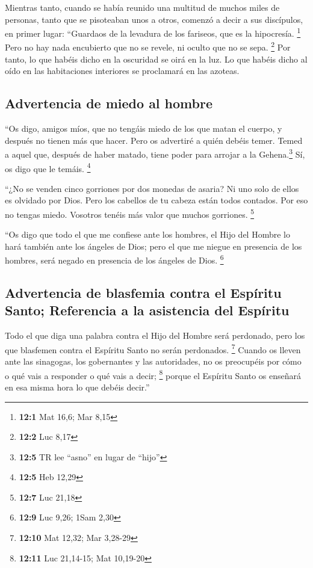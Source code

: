 \begin{paracol}{2}
 Mientras tanto, cuando se había reunido una multitud de
muchos miles de personas, tanto que se pisoteaban unos a otros, comenzó
a decir a sus discípulos, en primer lugar: ``Guardaos de la levadura de
los fariseos, que es la hipocresía. \footnote{\textbf{12:1} Mat 16,6;
  Mar 8,15}  Pero no hay nada encubierto que no se revele,
ni oculto que no se sepa. \footnote{\textbf{12:2} Luc 8,17}
 Por tanto, lo que habéis dicho en la oscuridad se oirá en
la luz. Lo que habéis dicho al oído en las habitaciones interiores se
proclamará en las azoteas.

\hypertarget{advertencia-de-miedo-al-hombre}{%
\subsection{Advertencia de miedo al
hombre}\label{advertencia-de-miedo-al-hombre}}

 ``Os digo, amigos míos, que no tengáis miedo de los que
matan el cuerpo, y después no tienen más que hacer.  Pero
os advertiré a quién debéis temer. Temed a aquel que, después de haber
matado, tiene poder para arrojar a la Gehena.\footnote{\textbf{12:5} TR
  lee ``asno'' en lugar de ``hijo''} Sí, os digo que le temáis.
\footnote{\textbf{12:5} Heb 12,29}

 ``¿No se venden cinco gorriones por dos monedas de
asaria? Ni uno solo de ellos es olvidado por Dios.  Pero
los cabellos de tu cabeza están todos contados. Por eso no tengas miedo.
Vosotros tenéis más valor que muchos gorriones. \footnote{\textbf{12:7}
  Luc 21,18}

 ``Os digo que todo el que me confiese ante los hombres,
el Hijo del Hombre lo hará también ante los ángeles de Dios;
 pero el que me niegue en presencia de los hombres, será
negado en presencia de los ángeles de Dios. \footnote{\textbf{12:9} Luc
  9,26; 1Sam 2,30}

\hypertarget{advertencia-de-blasfemia-contra-el-espuxedritu-santo-referencia-a-la-asistencia-del-espuxedritu}{%
\subsection{Advertencia de blasfemia contra el Espíritu Santo;
Referencia a la asistencia del
Espíritu}\label{advertencia-de-blasfemia-contra-el-espuxedritu-santo-referencia-a-la-asistencia-del-espuxedritu}}

 Todo el que diga una palabra contra el Hijo del Hombre
será perdonado, pero los que blasfemen contra el Espíritu Santo no serán
perdonados. \footnote{\textbf{12:10} Mat 12,32; Mar 3,28-29}
 Cuando os lleven ante las sinagogas, los gobernantes y
las autoridades, no os preocupéis por cómo o qué vais a responder o qué
vais a decir; \footnote{\textbf{12:11} Luc 21,14-15; Mat 10,19-20}
 porque el Espíritu Santo os enseñará en esa misma hora
lo que debéis decir.''


\end{paracol}
